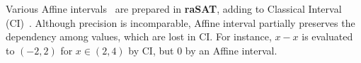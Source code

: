 \documentclass[runningheads,a4paper,oribibl]{llncs}
\newcommand{\Real}{{\mathbb R}}
\newcommand{\suppress}[1]{} %
\begin{document}
\suppress{
\begin{definition}\label{def:Testing}
Let $M = \bigwedge \limits_{i=1}^m x_i \in (a_i,b_i)$ and 
${\mathcal P} = \bigwedge \limits_{i=1}^m f_i(x_1,\cdots,x_n) > 0$. 
%
Let a choice function $\theta : (\Real \times \Real)^n \rightarrow \Real^n$ 
such that $\theta(M) \in (a_1,b_1) \times \cdots \times (a_n,b_n)$. 
Testing is a finite set $\Theta$ of choice functions. Then, we say 
\begin{itemize}
\item ${\mathcal P}$ is \emph{Test-SAT} under $M$ if $\theta(M)$ holds ${\mathcal P}$ 
for some $\theta \in \Theta$, and 
\item ${\mathcal P}$ is \emph{Test-UNSAT} under $M$ if $\theta(M)$ never holds ${\mathcal P}$ 
for each $\theta \in \Theta$. 
\end{itemize} 
\end{definition}
}


Various Affine intervals~\cite{Comba93affinearithmetic} are prepared in 
{\bf raSAT}, adding to Classical Interval (CI)~\cite{moore}. 
Although precision is incomparable, 
Affine interval partially preserves the dependency among values, which are lost in CI. 
For instance, $x - x$ is evaluated to $(-2,2)$ for $x \in (2,4)$ by CI, but $0$ by an Affine interval.
\end{document}
